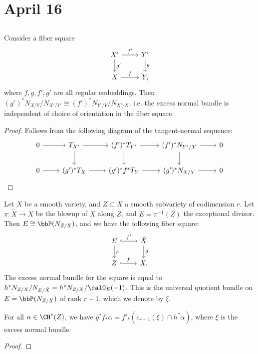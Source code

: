 \section{April 16}


\subsection{}

  \begin{lemma}
    Consider a fiber square
    \[
      \begin{tikzcd}
        X' \ar[r, "f'"] \ar[d, "g'"] & Y' \ar[d, "g"] \\
        X \ar[r, "f"] & Y,
      \end{tikzcd} 
    \]
    where $f,g,f',g'$ are all regular embeddings. 
    Then $(g')^* N_{X/Y} / N_{X'/Y'} \cong (f')^*N_{Y'/Y} / N_{X'/X}$,
    i.e. the excess normal bundle is independent of choice of orientation in the fiber square.
  \end{lemma}
  \begin{proof}
    Follows from the following diagram of the tangent-normal sequence:
    \[
      \begin{tikzcd}
        0 \ar[r] & T_{X'} \ar[r] \ar[d] & (f')^* T_{Y'} \ar[r] \ar[d] & (f')^* N_{Y'/Y} \ar[r] \ar[d] & 0 \\
        0 \ar[r] & (g')^* T_X \ar[r] & (g')^* f^* T_Y \ar[r] & (g')^* N_{X/Y} \ar[r] & 0
      \end{tikzcd}
    \]

    \Yang{}
  \end{proof}



  Let $X$ be a smooth variety, and $Z \subset X$ a smooth subvariety of codimension $r$.
  Let $\pi: \tilde{X} \to X$ be the blowup of $X$ along $Z$, and $E = \pi^{-1}(Z)$ the exceptional divisor. 
  Then $E \cong \bbP(N_{Z/X})$, and we have the following fiber square:
  \[
    \begin{tikzcd}
      E \ar[r, "f'", hook] \ar[d, "h"] & \tilde{X} \ar[d, "g"] \\
      Z \ar[r, "f", hook] & X.
    \end{tikzcd}
  \]
  The excess normal bundle for the square is equal to $h^* N_{Z/X} / N_{E/\tilde{X}} = h^* N_{Z/X} / \calO_E(-1)$.
  This is the universal quotient bundle on $E = \bbP(N_{Z/X})$ of rank $r-1$, which we denote by $\xi$.

  \begin{proposition}
    For all $\alpha \in \CH^*(Z)$, we have $g^* f_* \alpha = f'_* (c_{r-1}(\xi) \cap h^* \alpha)$, where $\xi$ is the excess normal bundle.
  \end{proposition}
  \begin{proof}
    

    \Yang{}
  \end{proof}

